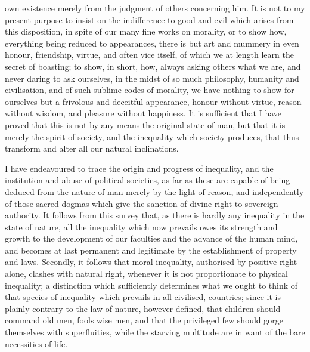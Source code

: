 \documentclass[12pt]{report}
\begin{document}
own existence merely from the judgment of others concerning him. It is not to my present purpose to insist on the indifference to good and evil which arises from this disposition, in spite of our many fine works on morality, or to show how, everything being reduced to appearances, there is but art and mummery in even honour, friendship, virtue, and often vice itself, of which we at length learn the secret of boasting; to show, in short, how, always asking others what we are, and never daring to ask ourselves, in the midst of so much philosophy, humanity and civilisation, and of such sublime codes of morality, we have nothing to show for ourselves but a frivolous and deceitful appearance, honour without virtue, reason without wisdom, and pleasure without happiness. It is sufficient that I have proved that this is not by any means the original state of man, but that it is merely the spirit of society, and the inequality which society produces, that thus transform and alter all our natural inclinations.

I have endeavoured to trace the origin and progress of inequality, and the institution and abuse of political societies, as far as these are capable of being deduced from the nature of man merely by the light of reason, and independently of those sacred dogmas which give the sanction of divine right to sovereign authority. It follows from this survey that, as there is hardly any inequality in the state of nature, all the inequality which now prevails owes its strength and growth to the development of our faculties and the advance of the human mind, and becomes at last permanent and legitimate by the establishment of property and laws. Secondly, it follows that moral inequality, authorised by positive right alone, clashes with natural right, whenever it is not proportionate to physical inequality; a distinction which sufficiently determines what we ought to think of that species of inequality which prevails in all civilised, countries; since it is plainly contrary to the law of nature, however defined, that children should command old men, fools wise men, and that the privileged few should gorge themselves with superfluities, while the starving multitude are in want of the bare necessities of life.
\end{document}
